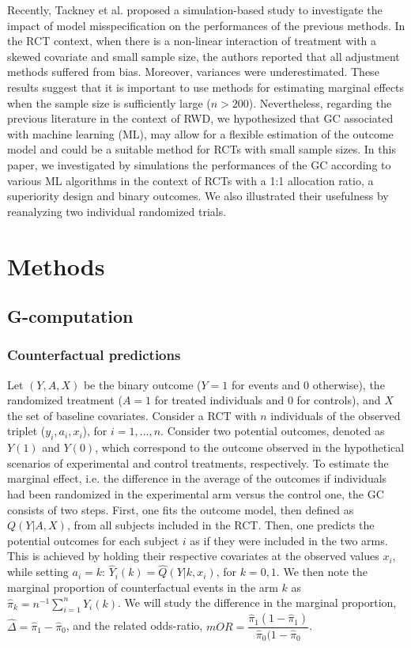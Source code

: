 \documentclass{article}
\begin{document}
Recently, Tackney et al.\cite{tackney_comparison_2023} proposed a simulation-based study to investigate the impact of model misspecification on the performances of the previous methods. In the RCT context, when there is a non-linear interaction of treatment with a skewed covariate and small sample size, the authors reported that all adjustment methods suffered from bias. Moreover, variances were underestimated. These results suggest that it is important to use methods for estimating marginal effects when the sample size is sufficiently large ($n>200$). Nevertheless, regarding the previous literature in the context of RWD,\cite{le_borgne_g-computation_2021} we hypothesized that GC associated with machine learning (ML), may allow for a flexible estimation of the outcome model and could be a suitable method for RCTs with small sample sizes. In this paper, we investigated by simulations the performances of the GC according to various ML algorithms in the context of RCTs with a 1:1 allocation ratio, a superiority design and binary outcomes. We also illustrated their usefulness by reanalyzing two individual randomized trials.

\section{Methods}\label{sec2}

\subsection{G-computation}

\subsubsection{Counterfactual predictions}

Let $(Y,A,X)$  be the binary outcome ($Y = 1$ for events and 0 otherwise), the randomized treatment ($A = 1$ for treated individuals and 0 for controls),  and $X$ the set of baseline covariates.  Consider a RCT with $n$ individuals of the observed triplet ($y_i,  a_i,  x_i$), for $i=1,...,n$. Consider two potential outcomes,  denoted as $Y(1)$  and $Y(0)$,  which correspond to the outcome observed in the hypothetical scenarios of experimental and control treatments, respectively. To estimate the marginal effect, i.e. the difference in the average of the outcomes if individuals had been randomized in the experimental arm versus the control one, the GC consists of two steps.\cite{rubin_estimating_1974} First, one fits the outcome model, then defined as $Q(Y|A,X)$, from all subjects included in the RCT. Then, one predicts the potential outcomes for each subject $i$ as if they were included in the two arms. This is achieved by holding their respective covariates at the observed values $x_i$, while setting $a_i=k$: $\hat{Y}_i(k) = \hat{Q}(Y| k, x_i)$,  for $k=0,1$. We then note the marginal proportion of counterfactual events in the arm $k$ as $\hat{\pi}_k = n^{-1}  \sum_{i=1}^n  \hat{Y}_i(k) $.  We will study the difference in the marginal proportion, $\hat{\Delta} = \hat{\pi}_1 -  \hat{\pi}_0$,  and  the related odds-ratio,  $  mOR =  \dfrac{ \hat{\pi}_1 (1-\hat{\pi}_1 )}{ \hat{\pi}_0 (1-\hat{\pi}_0}$.
\end{document}
